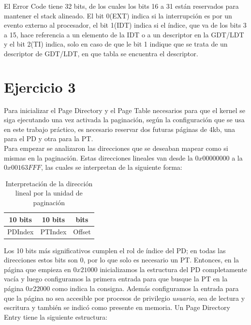 \documentclass[10pt, a4paper]{article}
\begin{document}
El Error Code tiene 32 bits, de los cuales los bits 16 a 31 están reservados para mantener el stack alineado. El bit 0(EXT) indica si la interrupción es por un evento externo al procesador, el bit 1(IDT) indica si el índice, que va de los bits 3 a 15, hace referencia a un elemento de la IDT o a un descriptor en la GDT/LDT y el bit 2(TI) indica, solo en caso de que le bit 1 indique que se trata de un descriptor de GDT/LDT, en que tabla se encuentra el descriptor.\newline

\section{Ejercicio 3}
Para inicializar el Page Directory y el Page Table necesarios para que el kernel se siga ejecutando una vez activada la paginaci\'on, seg\'un la configuraci\'on que se usa en este trabajo práctico, es necesario reservar dos futuras p\'aginas de 4kb, una para el PD y otra para la PT.\\
Para empezar se analizaron las direcciones que se deseaban mapear como si mismas en la paginaci\'on. Estas direcciones lineales van desde la $0x00000000$ a la $0x00163FFF$, las cuales se interpretan de la siguiente forma: \newline
\begin{table}[h]
	\centering
	\begin{tabular}{|c|c|c|}
		10 bits & 10 bits & \; \; 12 bits \; \; \\
		\hline
		PDIndex & PTIndex & Offset \\
		\hline
	\end{tabular}
	\caption{Interpretaci\'on de la direcci\'on lineal por la unidad de paginaci\'on}
\end{table}	\newline
Los 10 bits m\'as significativos cumplen el rol de \'indice del PD; en todas las direcciones estos bits son $0$, por lo que solo es necesario un PT. Entonces, en la p\'agina que empieza en $0x21000$ inicializamos la estructura del PD completamente vac\'ia y luego configuramos la primera entrada para que busque la PT en la p\'agina $0x22000$ como indica la consigna. Adem\'as configuramos la entrada para que la p\'agina no sea accesible por procesos de privilegio \textit{usuario}, sea de lectura y escritura y tambi\'en se indic\'o como presente en memoria. Un Page Directory Entry tiene la siguiente estructura:\newline
\end{document}
